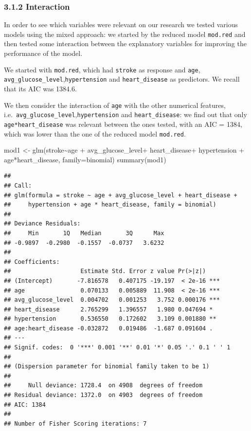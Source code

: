 \documentclass[
]{article}
\newenvironment{Shaded}{\begin{snugshade}}{\end{snugshade}}
\newcommand{\AttributeTok}[1]{\textcolor[rgb]{0.77,0.63,0.00}{#1}}
\newcommand{\FunctionTok}[1]{\textcolor[rgb]{0.00,0.00,0.00}{#1}}
\newcommand{\NormalTok}[1]{#1}
\newcommand{\OtherTok}[1]{\textcolor[rgb]{0.56,0.35,0.01}{#1}}
\newcommand{\SpecialCharTok}[1]{\textcolor[rgb]{0.00,0.00,0.00}{#1}}
\begin{document}
\hypertarget{interaction}{%
\subsubsection{3.1.2 Interaction}\label{interaction}}

In order to see which variables were relevant on our research we tested
various models using the mixed approach: we started by the reduced model
\texttt{mod.red} and then tested some interaction between the
explanatory variables for improving the performance of the model.

We started with \texttt{mod.red}, which had \texttt{stroke} as response
and \texttt{age}, \texttt{avg\_glucose\_level},\texttt{hypertension} and
\texttt{heart\_disease} as predictors. We recall that its AIC was
1384.6.

We then consider the interaction of \texttt{age} with the other
numerical features,
i.e.~\texttt{avg\_glucose\_level},\texttt{hypertension} and
\texttt{heart\_disease}: we find out that only
\texttt{age*heart\_disease} was relevant between the ones tested, with
an AIC = 1384, which was lower than the one of the reduced model
\texttt{mod.red}.

\begin{Shaded}
\begin{Highlighting}[]
\NormalTok{mod1 }\OtherTok{\textless{}{-}} \FunctionTok{glm}\NormalTok{(stroke}\SpecialCharTok{\textasciitilde{}}\NormalTok{age }\SpecialCharTok{+}\NormalTok{ avg\_glucose\_level}\SpecialCharTok{+}\NormalTok{ heart\_disease}\SpecialCharTok{+}\NormalTok{ hypertension }\SpecialCharTok{+}
\NormalTok{               age}\SpecialCharTok{*}\NormalTok{heart\_disease, }\AttributeTok{family=}\NormalTok{binomial)}
\FunctionTok{summary}\NormalTok{(mod1)}
\end{Highlighting}
\end{Shaded}

\begin{verbatim}
## 
## Call:
## glm(formula = stroke ~ age + avg_glucose_level + heart_disease + 
##     hypertension + age * heart_disease, family = binomial)
## 
## Deviance Residuals: 
##     Min       1Q   Median       3Q      Max  
## -0.9897  -0.2980  -0.1557  -0.0737   3.6232  
## 
## Coefficients:
##                    Estimate Std. Error z value Pr(>|z|)    
## (Intercept)       -7.816578   0.407175 -19.197  < 2e-16 ***
## age                0.070133   0.005889  11.908  < 2e-16 ***
## avg_glucose_level  0.004702   0.001253   3.752 0.000176 ***
## heart_disease      2.765299   1.396557   1.980 0.047694 *  
## hypertension       0.536550   0.172602   3.109 0.001880 ** 
## age:heart_disease -0.032872   0.019486  -1.687 0.091604 .  
## ---
## Signif. codes:  0 '***' 0.001 '**' 0.01 '*' 0.05 '.' 0.1 ' ' 1
## 
## (Dispersion parameter for binomial family taken to be 1)
## 
##     Null deviance: 1728.4  on 4908  degrees of freedom
## Residual deviance: 1372.0  on 4903  degrees of freedom
## AIC: 1384
## 
## Number of Fisher Scoring iterations: 7
\end{verbatim}
\end{document}
